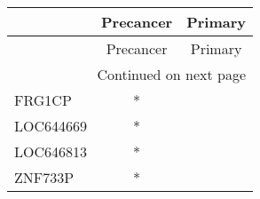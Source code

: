 \begin{longtable}{lcc}
\toprule
{} & Precancer & Primary \\
\midrule
\endfirsthead

\toprule
{} & Precancer & Primary \\
\midrule
\endhead
\midrule
\multicolumn{3}{r}{{Continued on next page}} \\
\midrule
\endfoot

\bottomrule
\endlastfoot
FRG1CP    &         * &         \\
LOC644669 &         * &         \\
LOC646813 &         * &         \\
ZNF733P   &         * &         \\
\end{longtable}
